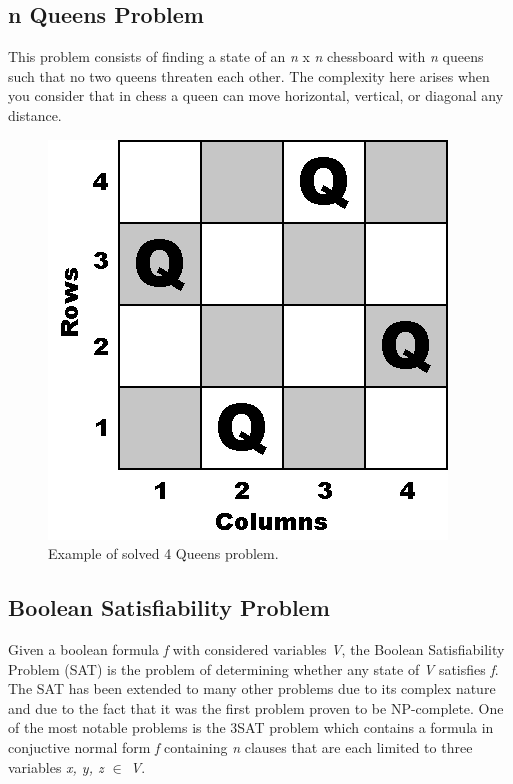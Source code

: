 \documentclass[10pt,twoside]{IEEEtran}
\begin{document}
\subsection{n Queens Problem}
This problem consists of finding a state of an \emph{n} x \emph{n} chessboard with \emph{n} queens such that no two queens threaten each other. The complexity here arises when you consider that in chess a queen can move horizontal, vertical, or diagonal any distance.

\begin{figure}[h]
	\centering
	\includegraphics[width=0.7\linewidth]{diagrams/nqueens.png}
	\caption{Example of solved 4 Queens problem.}
	\label{Nqueen fig}
\end{figure}

\subsection{Boolean Satisfiability Problem}
Given a boolean formula \emph{f} with considered variables \emph{V}, the Boolean Satisfiability Problem (SAT) is the problem of determining whether any state of \emph{V} satisfies \emph{f}. The SAT has been extended to many other problems due to its complex nature and due to the fact that it was the first problem proven to be NP-complete. One of the most notable problems is the 3SAT problem which contains a formula in conjuctive normal form \emph{f} containing \emph{n} clauses that are each limited to three variables \emph{x, y, z ${\in}$ V}.
\end{document}
